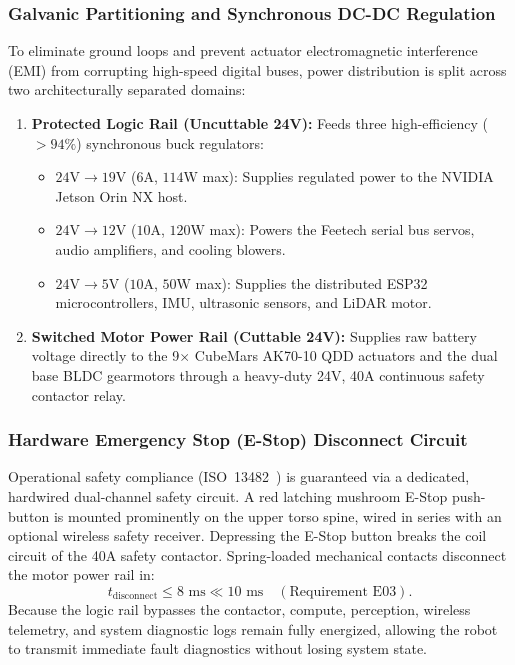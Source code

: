 \subsubsection{Galvanic Partitioning and Synchronous DC-DC Regulation}
To eliminate ground loops and prevent actuator electromagnetic interference (EMI) from corrupting high-speed digital buses, power distribution is split across two architecturally separated domains:
\begin{enumerate}[leftmargin=1.5em]
  \item \textbf{Protected Logic Rail (Uncuttable 24V):} Feeds three high-efficiency ($>94\%$) synchronous buck regulators:
  \begin{itemize}
    \item $24\text{V} \to 19\text{V}$ ($6\text{A}$, $114\text{W}$ max): Supplies regulated power to the NVIDIA Jetson Orin NX host.
    \item $24\text{V} \to 12\text{V}$ ($10\text{A}$, $120\text{W}$ max): Powers the Feetech serial bus servos, audio amplifiers, and cooling blowers.
    \item $24\text{V} \to 5\text{V}$ ($10\text{A}$, $50\text{W}$ max): Supplies the distributed ESP32 microcontrollers, IMU, ultrasonic sensors, and LiDAR motor.
  \end{itemize}
  \item \textbf{Switched Motor Power Rail (Cuttable 24V):} Supplies raw battery voltage directly to the 9$\times$ CubeMars AK70-10 QDD actuators and the dual base BLDC gearmotors through a heavy-duty 24V, 40A continuous safety contactor relay.
\end{enumerate}

\subsubsection{Hardware Emergency Stop (E-Stop) Disconnect Circuit}
Operational safety compliance (ISO~13482~\cite{iso13482}) is guaranteed via a dedicated, hardwired dual-channel safety circuit. A red latching mushroom E-Stop push-button is mounted prominently on the upper torso spine, wired in series with an optional wireless safety receiver. Depressing the E-Stop button breaks the coil circuit of the 40A safety contactor. Spring-loaded mechanical contacts disconnect the motor power rail in:
\begin{equation}
  t_{\text{disconnect}} \le 8\text{ ms} \ll 10\text{ ms} \quad (\text{Requirement E03}).
\end{equation}
Because the logic rail bypasses the contactor, compute, perception, wireless telemetry, and system diagnostic logs remain fully energized, allowing the robot to transmit immediate fault diagnostics without losing system state.

